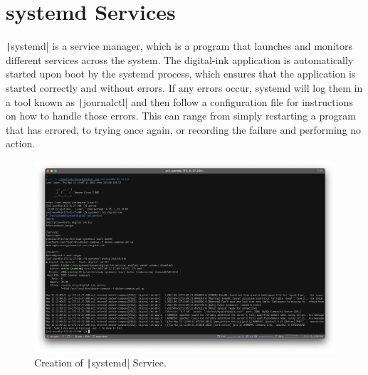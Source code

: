 \section{systemd Services}\label{sec:systemd-services}
\texttt|systemd| is a service manager, which is a program that launches and monitors different services across
the system.
The digital-ink application is automatically started upon boot by the systemd process, which ensures that the
application is started correctly and without errors.
If any errors occur, systemd will log them in a tool known as \texttt|journalctl| and then follow a
configuration file for instructions on how to handle those errors.
This can range from simply restarting a program that has errored, to trying once again, or recording the failure and
performing no action.

\begin{figure}[!htbp]
    \centering
    \includegraphics[width=\textwidth]{resources/systemd/systemd}
    \caption{Creation of \texttt|systemd| Service.}
    \label{fig:systemd}
\end{figure}
